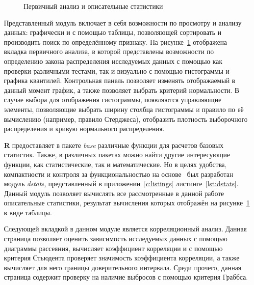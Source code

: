 \begin{figure}[ht]
\caption{Первичный анализ и описательные статистики}
\label{img:mod_basis}
\end{figure}
Представленный модуль включает в себя возможности по просмотру и анализу данных: графически и с помощью таблицы, позволяющей сортировать и производить поиск по определённому признаку. На рисунке~\ref{img:mod_basis} отображена вкладка первичного анализа, в которой представлены возможности по определению закона распределения исследуемых данных с помощью как проверки различными тестами, так и визуально с помощью гистограммы и графика квантилей. Контрольная панель позволяет изменять отображаемый в данный момент график, а также позволяет выбрать критерий нормальности. В случае выбора для отображения гистограммы, появляются управляющие элементы, позволяющие выбрать ширину столбца гистограммы и правило по её вычислению (например, правило Стерджеса), отобразить плотность выборочного распределения и кривую нормального распределения.

\textbf{R} предоставляет в пакете \textit{base} различные функции для расчетов базовых статистик. Также, в различных пакетах можно найти другие интересующие функции, как статистические, так и математические. Но в целях удобства, компактности и контроля за функциональностью на основе~\cite{Eliseeva1995, Cramer1997} был разработан модуль \textit{dstats}, представленный в приложении~\ref{c:listings} листинге~\ref{lst:dstats}. Данный модуль позволяет вычислять все рассмотренные в данной работе описательные статистики, результат вычисления которых отображён на рисунке~\ref{img:mod_basis} в виде таблицы.

Следующей вкладкой в данном модуле является корреляционный анализ. Данная страница позволяет оценить зависимость исследуемых данных с помощью диаграммы рассеяния, вычисляет коэффициент корреляции и с помощью критерия Стьюдента проверяет значимость коэффициента корреляции, а также вычисляет для него границы доверительного интервала. Среди прочего, данная страница содержит проверку на наличие выбросов с помощью критерия Граббса.


